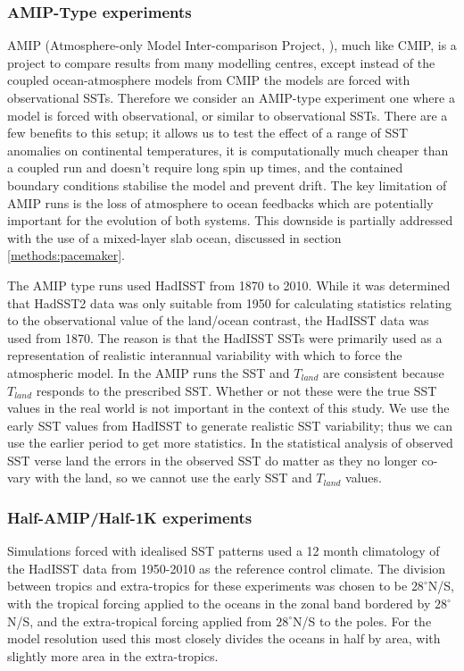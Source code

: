 \subsubsection{AMIP-Type experiments}\label{methods:amip}
AMIP (Atmosphere-only Model Inter-comparison Project, \citep{Gates1999}), much 
like CMIP, is a project to compare results from many modelling centres, except 
instead of the coupled ocean-atmosphere models from CMIP the models are forced 
with observational SSTs.  Therefore we consider an AMIP-type experiment one 
where a model is forced with observational, or similar to observational SSTs.  
There are a few benefits to this setup; it allows us to test the effect of a 
range of SST anomalies on continental temperatures, it is computationally much 
cheaper than a coupled run and doesn't require long spin up times, and the 
contained boundary conditions stabilise the model and prevent drift. The key 
limitation of AMIP runs is the loss of atmosphere to ocean feedbacks which are 
potentially important for the evolution of both systems. This downside is 
partially addressed with the use of a mixed-layer slab ocean, discussed in 
section \ref{methods:pacemaker}.

The AMIP type runs used HadISST from 1870 to 2010. While it was determined that 
HadSST2 data was only suitable from 1950 for calculating statistics relating to 
the observational value of the land/ocean contrast, the HadISST data was used from 
1870. The reason is that the HadISST SSTs were primarily used as a 
representation of realistic interannual variability with which to force the 
atmospheric model.  In the AMIP runs the SST and $T_{land}$ are consistent 
because $T_{land}$ responds to the prescribed SST.  Whether or not these were 
the true SST values in the real world is not important in the context of this 
study.  We use the early SST values from HadISST to generate realistic SST 
variability; thus we can use the earlier period to get more statistics. In the 
statistical analysis of observed SST verse land the errors in the observed SST 
do matter as they no longer co-vary with the land, so we cannot use the early 
SST and $T_{land}$ values.

\subsubsection{Half-AMIP/Half-1K experiments}
Simulations forced with idealised SST patterns used a 12 month climatology of 
the HadISST data from 1950-2010 as the reference control climate. The division 
between tropics and extra-tropics for these experiments was chosen to be 
$28^{\circ}$N/S, with the tropical forcing applied to the oceans in the zonal 
band bordered by $28^{\circ}$N/S, and the extra-tropical forcing applied from 
$28^{\circ}$N/S to the poles. For the model resolution used this most closely 
divides the oceans in half by area, with slightly more area in the 
extra-tropics.

